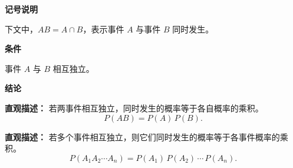 \begin{statementbox}

	\textbf{\textcolor{CStatement}{记号说明}}

	下文中，$AB=A\cap B$，表示事件 $A$ 与事件 $B$ 同时发生。

	\medskip

	\textbf{\textcolor{CStatement}{条件}}

	\begin{description}[style=nextline, leftmargin=2.8em, labelsep=0.5em, itemsep=0.35em]
		\item[\textbf{\textcolor{CStatement}{条件 1（事件独立）：}}]
		      事件 $A$ 与 $B$ 相互独立。
	\end{description}

	\textbf{\textcolor{CStatement}{结论}}

	\begin{description}[style=nextline, leftmargin=2.8em, labelsep=0.5em, itemsep=0.45em]
		\item[\textbf{\textcolor{CStatement}{结论一（乘积公式）：}}]
		      \textbf{\textcolor{CStatement}{直观描述：}}
		      若两事件相互独立，同时发生的概率等于各自概率的乘积。
		      \[
			      P(AB)=P(A)\,P(B).
		      \]

		\item[\textbf{\textcolor{CStatement}{推广结论（多个事件）：}}]
		      \textbf{\textcolor{CStatement}{直观描述：}}
		      若多个事件相互独立，则它们同时发生的概率等于各事件概率的乘积。
		      \[
			      P(A_1A_2\cdots A_n)
			      =
			      P(A_1)\,P(A_2)\,\cdots\,P(A_n).
		      \]
	\end{description}

\end{statementbox}